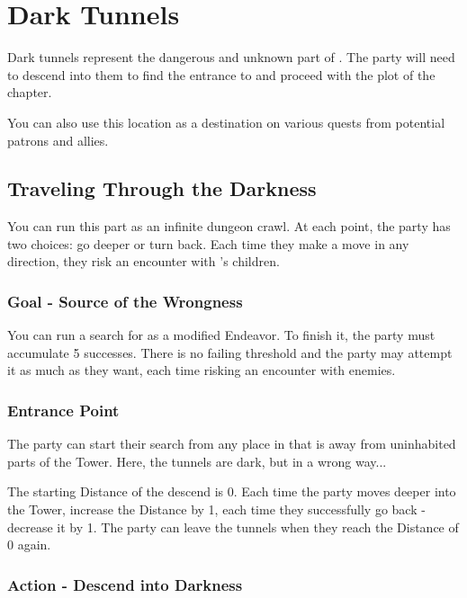 \section{Dark Tunnels}
\label{sec:darkTunnels}

Dark tunnels represent the dangerous and unknown part of \locationUrithiru{}. The party will need to descend into them to find the entrance to  and proceed with the plot of the chapter. 

You can also use this location as a destination on various quests from potential patrons and allies.

\subsection{Traveling Through the Darkness}

You can run this part as an infinite dungeon crawl. At each point, the party has two choices: go deeper or turn back. Each time they make a move in any direction, they risk an encounter with \npcMidnightMother{}'s children.

\subsubsection{Goal - Source of the Wrongness}

You can run a search for  as a modified Endeavor. To finish it, the party must accumulate 5 successes. There is no failing threshold and the party may attempt it as much as they want, each time  risking an encounter with enemies.

\subsubsection{Entrance Point}

The party can start their search from any place in \locationUrithiru{} that is away from uninhabited parts of the Tower. Here, the tunnels are dark, but in a wrong way...

The starting Distance of the descend is 0. Each time the party moves deeper into the Tower, increase the Distance by 1, each time they successfully go back - decrease it by 1. The party can leave the tunnels when they reach the Distance of 0 again.

\subsubsection{Action - Descend into Darkness}

